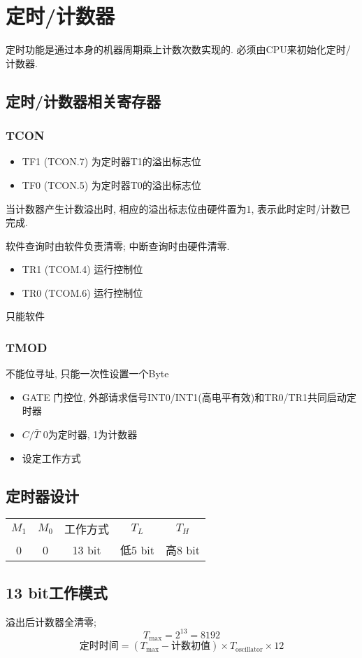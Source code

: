 \documentclass[a4paper]{report}
\begin{document}
\chapter{定时/计数器}
定时功能是通过本身的机器周期乘上计数次数实现的. 
必须由CPU来初始化定时/计数器. 
\section{定时/计数器相关寄存器}
\subsection{TCON}
\begin{itemize}
  \item TF1 (TCON.7) 为定时器T1的溢出标志位
  \item TF0 (TCON.5) 为定时器T0的溢出标志位
\end{itemize}
当计数器产生计数溢出时, 相应的溢出标志位由硬件置为1, 表示此时定时/计数已完成. 

软件查询时由软件负责清零; 中断查询时由硬件清零. 
\begin{itemize}
  \item TR1 (TCOM.4) 运行控制位
  \item TR0 (TCOM.6) 运行控制位
\end{itemize}
只能软件
\subsection{TMOD}不能位寻址, 只能一次性设置一个Byte
\begin{itemize}
  \item GATE 门控位, 外部请求信号INT0/INT1(高电平有效)和TR0/TR1共同启动定时器
  \item $C/ \bar{T}$ 0为定时器, 1为计数器
  \item 设定工作方式
\end{itemize}
\section{定时器设计}
\begin{table}
  \centering
  \begin{tabular}{cc|c|cc}
    $M_1$&$M_0$&工作方式&$T_L$&$T_H$
    \\ 0&0&13 bit&低5 bit&高8 bit
  \end{tabular}
\end{table}
\section{13 bit工作模式}
溢出后计数器全清零; 
$$T_{\max}=2^{13}=8192$$
\begin{equation}
  \text{定时时间}=(T_{\max}-\text{计数初值}) \times T_{\text{oscillator}} \times 12
\end{equation}
\end{document}
